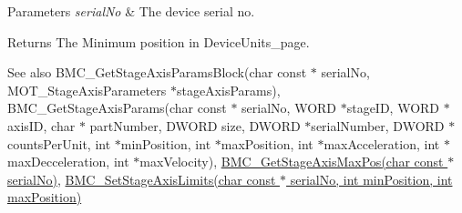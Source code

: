 \begin{DoxyParams}{Parameters}
{\em serial\+No} & The device serial no. \\
\hline
\end{DoxyParams}
\begin{DoxyReturn}{Returns}
The Minimum position in Device\+Units\+\_\+page. 
\end{DoxyReturn}
\begin{DoxySeeAlso}{See also}
B\+M\+C\+\_\+\+Get\+Stage\+Axis\+Params\+Block(char const $\ast$ serial\+No, M\+O\+T\+\_\+\+Stage\+Axis\+Parameters $\ast$stage\+Axis\+Params), B\+M\+C\+\_\+\+Get\+Stage\+Axis\+Params(char const $\ast$ serial\+No, W\+O\+R\+D $\ast$stage\+I\+D, W\+O\+R\+D $\ast$axis\+I\+D, char $\ast$ part\+Number, D\+W\+O\+R\+D size, D\+W\+O\+R\+D $\ast$serial\+Number, D\+W\+O\+R\+D $\ast$counts\+Per\+Unit, int $\ast$min\+Position, int $\ast$max\+Position, int $\ast$max\+Acceleration, int $\ast$max\+Decceleration, int $\ast$max\+Velocity), \hyperlink{group___t_cube_brushless_motor_ga19bb9bd09339a3489c09538ea7c80dd4}{B\+M\+C\+\_\+\+Get\+Stage\+Axis\+Max\+Pos(char const $\ast$ serial\+No)}, \hyperlink{group___t_cube_brushless_motor_ga0c08eca51103edd266a7258007d6944b}{B\+M\+C\+\_\+\+Set\+Stage\+Axis\+Limits(char const $\ast$ serial\+No, int min\+Position, int max\+Position)}


\end{DoxySeeAlso}
